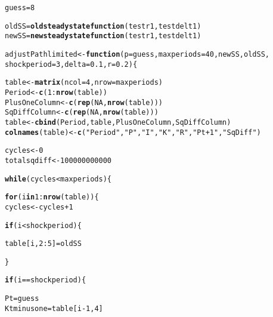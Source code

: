 \documentclass{article}\usepackage[]{graphicx}\usepackage[]{color}
\makeatletter
\newcommand{\hlnum}[1]{\textcolor[rgb]{0.686,0.059,0.569}{#1}}%
\newcommand{\hlstr}[1]{\textcolor[rgb]{0.192,0.494,0.8}{#1}}%
\newcommand{\hlopt}[1]{\textcolor[rgb]{0,0,0}{#1}}%
\newcommand{\hlstd}[1]{\textcolor[rgb]{0.345,0.345,0.345}{#1}}%
\newcommand{\hlkwa}[1]{\textcolor[rgb]{0.161,0.373,0.58}{\textbf{#1}}}%
\newcommand{\hlkwb}[1]{\textcolor[rgb]{0.69,0.353,0.396}{#1}}%
\newcommand{\hlkwc}[1]{\textcolor[rgb]{0.333,0.667,0.333}{#1}}%
\newcommand{\hlkwd}[1]{\textcolor[rgb]{0.737,0.353,0.396}{\textbf{#1}}}%
\newenvironment{kframe}{%
 \def\at@end@of@kframe{}%
 \ifinner\ifhmode%
  \def\at@end@of@kframe{\end{minipage}}%
  \begin{minipage}{\columnwidth}%
 \fi\fi%
 \def\FrameCommand##1{\hskip\@totalleftmargin \hskip-\fboxsep
 \colorbox{shadecolor}{##1}\hskip-\fboxsep
     \hskip-\linewidth \hskip-\@totalleftmargin \hskip\columnwidth}%
 \MakeFramed {\advance\hsize-\width
   \@totalleftmargin\z@ \linewidth\hsize
   \@setminipage}}%
 {\par\unskip\endMakeFramed%
 \at@end@of@kframe}
\newenvironment{knitrout}{}{} %
\makeatother
\begin{document}
\begin{knitrout}
\color{fgcolor}\begin{kframe}
\begin{alltt}
\hlstd{guess} \hlkwb{=} \hlnum{8}

\hlstd{oldSS} \hlkwb{=} \hlkwd{oldsteadystatefunction}\hlstd{(testr1, testdelt1)}
\hlstd{newSS} \hlkwb{=} \hlkwd{newsteadystatefunction}\hlstd{(testr1, testdelt1)}



\hlstd{adjustPathlimited} \hlkwb{<-} \hlkwa{function}\hlstd{(}\hlkwc{p} \hlstd{= guess,} \hlkwc{maxperiods} \hlstd{=} \hlnum{40}\hlstd{,} \hlkwc{newSS}\hlstd{,} \hlkwc{oldSS}\hlstd{,}
\hlkwc{shockperiod} \hlstd{=} \hlnum{3}\hlstd{,} \hlkwc{delta} \hlstd{=} \hlnum{0.1}\hlstd{,} \hlkwc{r} \hlstd{=} \hlnum{0.2}\hlstd{) \{}

  \hlstd{table} \hlkwb{<-} \hlkwd{matrix}\hlstd{(}\hlkwc{ncol} \hlstd{=} \hlnum{4}\hlstd{,} \hlkwc{nrow} \hlstd{= maxperiods)}
  \hlstd{Period} \hlkwb{<-} \hlkwd{c}\hlstd{(}\hlnum{1}\hlopt{:}\hlkwd{nrow}\hlstd{(table))}
  \hlstd{PlusOneColumn} \hlkwb{<-} \hlkwd{c}\hlstd{(}\hlkwd{rep}\hlstd{(}\hlnum{NA}\hlstd{,} \hlkwd{nrow}\hlstd{(table)))}
  \hlstd{SqDiffColumn} \hlkwb{<-} \hlkwd{c}\hlstd{(}\hlkwd{rep}\hlstd{(}\hlnum{NA}\hlstd{,} \hlkwd{nrow}\hlstd{(table)))}
  \hlstd{table} \hlkwb{<-} \hlkwd{cbind}\hlstd{(Period,table,PlusOneColumn,SqDiffColumn)}
  \hlkwd{colnames}\hlstd{(table)} \hlkwb{<-} \hlkwd{c}\hlstd{(}\hlstr{"Period"}\hlstd{,}\hlstr{"P"}\hlstd{,} \hlstr{"I"}\hlstd{,} \hlstr{"K"}\hlstd{,} \hlstr{"R"}\hlstd{,} \hlstr{"Pt + 1"}\hlstd{,} \hlstr{"Sq Diff"}\hlstd{)}

  \hlstd{cycles} \hlkwb{<-} \hlnum{0}
  \hlstd{totalsqdiff} \hlkwb{<-} \hlnum{100000000000}

  \hlkwa{while} \hlstd{(cycles} \hlopt{<} \hlstd{maxperiods)\{}

    \hlkwa{for} \hlstd{(i} \hlkwa{in} \hlnum{1}\hlopt{:}\hlkwd{nrow}\hlstd{(table))\{}
      \hlstd{cycles} \hlkwb{<-} \hlstd{cycles} \hlopt{+} \hlnum{1}

      \hlkwa{if} \hlstd{(i} \hlopt{<} \hlstd{shockperiod)\{}

        \hlstd{table[i,}\hlnum{2}\hlopt{:}\hlnum{5}\hlstd{]} \hlkwb{=} \hlstd{oldSS}

      \hlstd{\}}

      \hlkwa{if} \hlstd{(i} \hlopt{==} \hlstd{shockperiod)\{}

        \hlstd{Pt} \hlkwb{=} \hlstd{guess}
        \hlstd{Ktminusone} \hlkwb{=} \hlstd{table[i}\hlopt{-}\hlnum{1}\hlstd{,}\hlnum{4}\hlstd{]}


\end{alltt}
\end{kframe}
\end{knitrout}
\end{document}
